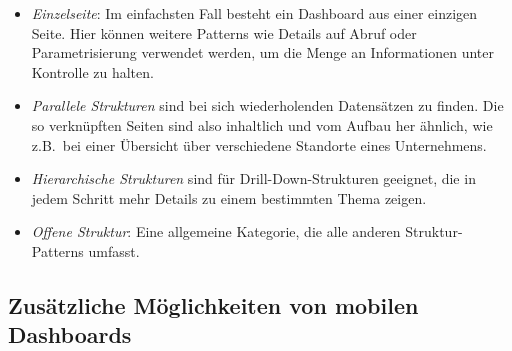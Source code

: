\begin{itemize}
    \item \emph{Einzelseite}: Im einfachsten Fall besteht ein Dashboard aus einer einzigen Seite.
    Hier können weitere Patterns wie Details auf Abruf oder Parametrisierung verwendet werden, um die Menge an Informationen unter Kontrolle zu halten.
    \item \emph{Parallele Strukturen} sind bei sich wiederholenden Datensätzen zu finden.
    Die so verknüpften Seiten sind also inhaltlich und vom Aufbau her ähnlich, wie z.B.\ bei einer Übersicht über verschiedene Standorte eines Unternehmens.
    \item \emph{Hierarchische Strukturen} sind für Drill-Down-Strukturen geeignet, die in jedem Schritt mehr Details zu einem bestimmten Thema zeigen.
    \item \emph{Offene Struktur}: Eine allgemeine Kategorie, die alle anderen Struktur-Patterns umfasst.
\end{itemize}

\subsection{Zusätzliche Möglichkeiten von mobilen Dashboards}\label{subsec:additional-capabilities-of-mobile-dashboards}


\autocite{Yigitbasioglu.AReviewOfDashboardsInPerformanceManagement.2012}

\autocite{Watson.MobileBi.2015}
